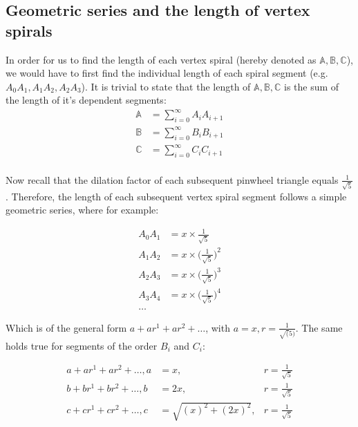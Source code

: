 \subsection{Geometric series and the length of vertex spirals}
In order for us to find the length of each vertex spiral (hereby denoted as $\mathbb{A}, \mathbb{B}, \mathbb{C}$), we would have to first find the individual length of each spiral segment (e.g. $A_{0}A_{1}, A_{1}A_{2}, A_{2}A_{3}$). It is trivial to state that the length of $\mathbb{A}, \mathbb{B}, \mathbb{C}$ is the sum of the length of it's dependent segments:
\begin{equation}
    \begin{aligned}
        \mathbb{A} &= \sum_{i = 0}^{\infty} A_{i}A_{i+1} \\
        \mathbb{B} &= \sum_{i = 0}^{\infty} B_{i}B_{i+1} \\
        \mathbb{C} &= \sum_{i = 0}^{\infty} C_{i}C_{i+1} \\
    \end{aligned}
\end{equation}

\noindent
Now recall that the dilation factor of each subsequent pinwheel triangle equals $\frac{1}{\sqrt{5}}$. Therefore, the length of each subsequent vertex spiral segment follows a simple geometric series, where for example:

\begin{equation}
    \begin{aligned}
        A_{0}A_{1} &= x \times \frac{1}{\sqrt{5}} \\
        A_{1}A_{2} &= x \times \big(\frac{1}{\sqrt{5}}\big)^2 \\
        A_{2}A_{3} &= x \times \big(\frac{1}{\sqrt{5}}\big)^3 \\
        A_{3}A_{4} &= x \times \big(\frac{1}{\sqrt{5}}\big)^4 \\
        \ldots
    \end{aligned}
\end{equation}

\noindent
Which is of the general form $a + ar^1 + ar^2 + \ldots$, with $a = x, r = \frac{1}{\sqrt(5)}$. The same holds true for segments of the order $B_{i}$ and $C_{i}$:

\begin{equation}
    \begin{aligned}
        a + ar^1 + ar^2 + \ldots, a &= x, &r = \frac{1}{\sqrt{5}} \\
        b + br^1 + br^2 + \ldots, b &= 2x, &r = \frac{1}{\sqrt{5}} \\
        c + cr^1 + cr^2 + \ldots, c &= \sqrt{(x)^2 + (2x)^2}, &r = \frac{1}{\sqrt{5}} \\
    \end{aligned}
\end{equation}


